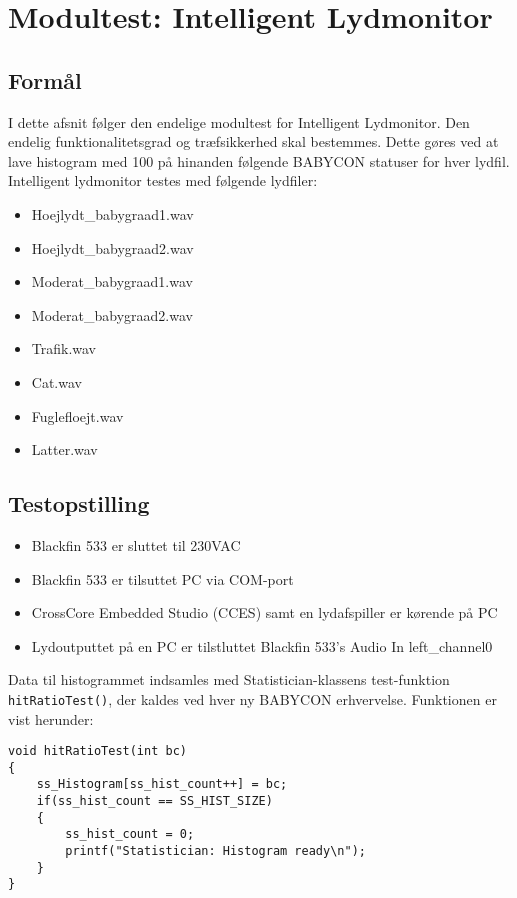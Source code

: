 \section{Modultest: Intelligent Lydmonitor}

\subsection*{Formål}
I dette afsnit følger den endelige modultest for Intelligent Lydmonitor. Den endelig funktionalitetsgrad og træfsikkerhed skal bestemmes. Dette gøres ved at lave histogram med 100 på hinanden følgende BABYCON statuser for hver lydfil. Intelligent lydmonitor testes med følgende lydfiler:
\begin{itemize}
	\item Hoejlydt\_babygraad1.wav
	\item Hoejlydt\_babygraad2.wav
	\item Moderat\_babygraad1.wav
	\item Moderat\_babygraad2.wav
	\item Trafik.wav
	\item Cat.wav
	\item Fuglefloejt.wav
	\item Latter.wav
\end{itemize}

\subsection*{Testopstilling}
\begin{itemize}
	\item Blackfin 533 er sluttet til 230VAC
	\item Blackfin 533 er tilsuttet PC via COM-port
	\item CrossCore Embedded Studio (CCES) samt en lydafspiller er kørende på PC
	\item Lydoutputtet på en PC er tilstluttet Blackfin 533's Audio In left\_channel0
\end{itemize}

Data til histogrammet indsamles med Statistician-klassens test-funktion \verb+hitRatioTest()+, der kaldes ved hver ny BABYCON erhvervelse. Funktionen er vist herunder:
\begin{verbatim}void hitRatioTest(int bc)
{
    ss_Histogram[ss_hist_count++] = bc;
    if(ss_hist_count == SS_HIST_SIZE)
    {
        ss_hist_count = 0;
        printf("Statistician: Histogram ready\n");
    }
}
\end{verbatim}

